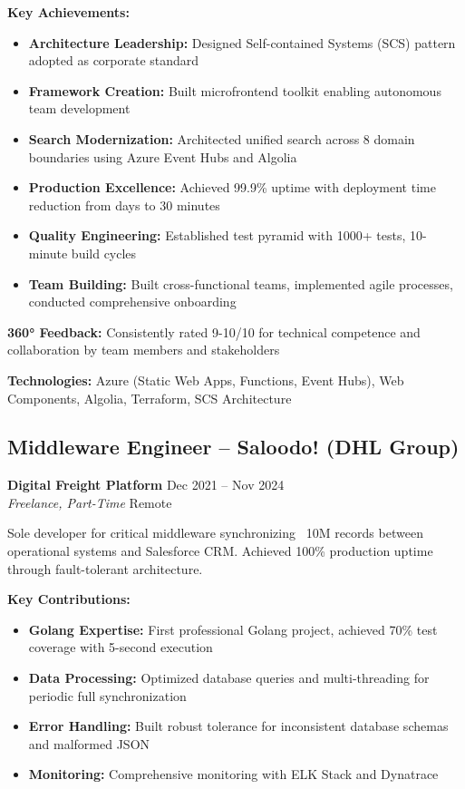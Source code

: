 \documentclass[11pt,a4paper]{article}
\newcommand{\role}[4]{\textbf{#1} \hfill #2 \\ \textit{#3} \hfill #4}
\begin{document}
\textbf{Key Achievements:}
\begin{itemize}
\item \textbf{Architecture Leadership:} Designed Self-contained Systems (SCS) pattern adopted as corporate standard
\item \textbf{Framework Creation:} Built microfrontend toolkit enabling autonomous team development
\item \textbf{Search Modernization:} Architected unified search across 8 domain boundaries using Azure Event Hubs and Algolia
\item \textbf{Production Excellence:} Achieved 99.9\% uptime with deployment time reduction from days to 30 minutes
\item \textbf{Quality Engineering:} Established test pyramid with 1000+ tests, 10-minute build cycles
\item \textbf{Team Building:} Built cross-functional teams, implemented agile processes, conducted comprehensive onboarding
\end{itemize}

\textbf{360° Feedback:} Consistently rated 9-10/10 for technical competence and collaboration by team members and stakeholders

\textbf{Technologies:} Azure (Static Web Apps, Functions, Event Hubs), Web Components, Algolia, Terraform, SCS Architecture

\subsection{Middleware Engineer -- Saloodo! (DHL Group)}
\role{Digital Freight Platform}{Dec 2021 -- Nov 2024}{Freelance, Part-Time}{Remote}

Sole developer for critical middleware synchronizing ~10M records between operational systems and Salesforce CRM. Achieved 100\% production uptime through fault-tolerant architecture.

\textbf{Key Contributions:}
\begin{itemize}
\item \textbf{Golang Expertise:} First professional Golang project, achieved 70\% test coverage with 5-second execution
\item \textbf{Data Processing:} Optimized database queries and multi-threading for periodic full synchronization
\item \textbf{Error Handling:} Built robust tolerance for inconsistent database schemas and malformed JSON
\item \textbf{Monitoring:} Comprehensive monitoring with ELK Stack and Dynatrace
\end{itemize}
\end{document}
